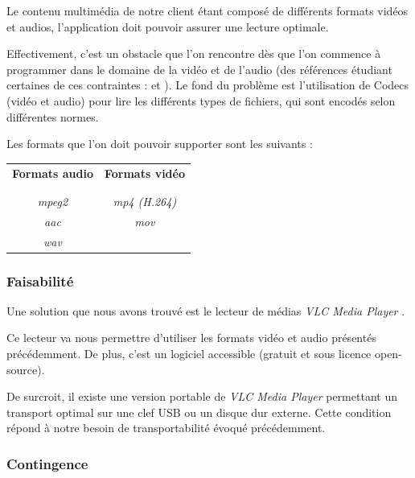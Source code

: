 \documentclass[a4paper,twoside,10pt]{report}
\begin{document}
Le contenu multimédia de notre client étant composé de différents formats vidéos et audios, l’application doit pouvoir assurer une lecture optimale.

Effectivement, c’est un obstacle que l’on rencontre dès que l’on commence à programmer dans le domaine de la vidéo et de l’audio (des références étudiant certaines de ces contraintes : \cite{ghanbari1999video} et \cite{he2013introduction}).
Le fond du problème est l’utilisation de Codecs (vidéo et audio) pour lire les différents types de fichiers, qui sont encodés selon différentes normes.

Les formats que l’on doit pouvoir supporter sont les suivants :\\

\begin{center}
\begin{tabular}{c|c}
\textbf{Formats audio} & \textbf{Formats vidéo} \\
\\
\hline
\\
\textit{mpeg2} & \textit{mp4 (H.264)}\\
\textit{aac} & \textit{mov}\\
\textit{wav} & ~
\end{tabular}
\end{center}
\vspace{0.6cm}

\subsubsection{Faisabilité}

Une solution que nous avons trouvé est le lecteur de médias \textit{VLC Media Player} \cite{solutions2006vlc}.

Ce lecteur va nous permettre d'utiliser les formats vidéo et audio présentés précédemment. De plus, c'est un logiciel accessible (gratuit et sous licence open-source).

De surcroit, il existe une version portable de \textit{VLC Media Player} permettant un transport optimal sur une clef USB ou un disque dur externe. Cette condition répond à notre besoin de transportabilité évoqué précédemment.

\subsubsection{Contingence}
\end{document}
